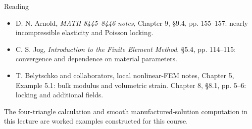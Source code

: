 \documentclass[11pt,aspectratio=169]{beamer}
\begin{document}
\begin{frame}{Reading}
\begin{itemize}
\item D. N. Arnold, \emph{MATH 8445--8446 notes}, Chapter 9,
\S9.4, pp. 155--157: nearly incompressible elasticity and Poisson locking.
\item C. S. Jog, \emph{Introduction to the Finite Element Method},
\S5.4, pp. 114--115: convergence and dependence on material parameters.
\item T. Belytschko and collaborators, local nonlinear-FEM notes,
Chapter 5, Example 5.1: bulk modulus and volumetric strain.
Chapter 8, \S8.1, pp. 5--6: locking and additional fields.
\end{itemize}
\vspace{0.2cm}
The four-triangle calculation and smooth manufactured-solution computation
in this lecture are worked examples constructed for this course.
\end{frame}
\end{document}
